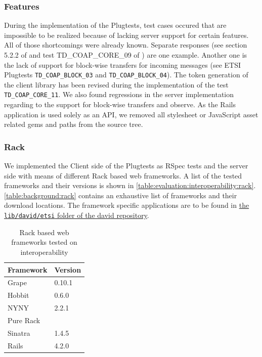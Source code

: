 		\subsubsection{Features}


			During the implementation of the Plugtests, test cases occured that
			are impossible to be realized because of lacking server support for
			certain features. All of those shortcomings were already known.
			Separate responses (see section 5.2.2 of \cite{coap} and test
			TD\_COAP\_CORE\_09 of \cite{etsi-plugtests}) are one example.
			Another one is the lack of support for block-wise transfers for
			incoming messages (see \ac{ETSI} Plugtests
			\texttt{TD\_COAP\_BLOCK\_03} and \texttt{TD\_COAP\_BLOCK\_04}).
			The token generation of the client library has been revised during
			the implementation of the test \texttt{TD\_COAP\_CORE\_11}. We also
			found regressions in the server implementation regarding to the
			support for block-wise transfers and observe. As the \ac{Rails}
			application is used solely as an \ac{API}, we removed all
			stylesheet or JavaScript asset related gems and paths from the
			source tree.

		\subsubsection{Rack}
		\label{cha:evaluation:interoperability:rack}


			We implemented the Client side of the Plugtests as RSpec tests and
			the server side with means of different Rack based web frameworks.
			A list of the tested frameworks and their versions is shown in
			\autoref{table:evaluation:interoperability:rack}.
			\autoref{table:background:rack} contains an exhaustive list of
			frameworks and their download locations. The framework specific
			applications are to be found in
			\href{https://github.com/nning/david/tree/0.4.3/lib/david/etsi}{the
			\texttt{lib/david/etsi} folder of the david repository}.

			\begin{table}[H]
				\begin{center}
					\begin{tabular}{l|l}
						Framework		& Version \\
						\hline
						Grape			& 0.10.1 \\
						Hobbit			& 0.6.0	 \\
						NYNY			& 2.2.1	\\
						Pure Rack		& \\	 
						Sinatra			& 1.4.5	\\
						\acl{Rails}		& 4.2.0	\\
					\end{tabular}
				\end{center}
				\caption{Rack based web frameworks tested on interoperability}
				\label{table:evaluation:interoperability:rack}
			\end{table}

